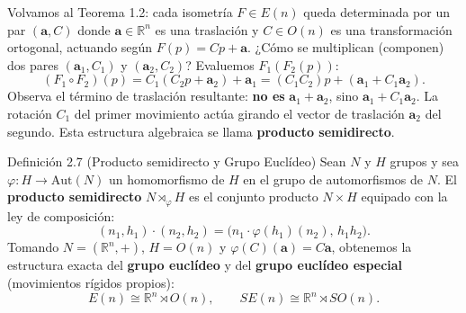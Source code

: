 \documentclass[11pt,letterpaper]{article}
\newcommand{\term}[1]{\textbf{\color{orangeacc}#1}}
\begin{document}
Volvamos al Teorema 1.2: cada isometría $F\in E(n)$ queda determinada por un par $(\mathbf{a},C)$ donde $\mathbf{a}\in\mathbb{R}^n$ es una traslación y $C\in O(n)$ es una transformación ortogonal, actuando según $F(p)=Cp+\mathbf{a}$. ¿Cómo se multiplican (componen) dos pares $(\mathbf{a}_1,C_1)$ y $(\mathbf{a}_2,C_2)$? Evaluemos $F_1(F_2(p))$:
\begin{equation}
  (F_1\circ F_2)(p) = C_1(C_2 p + \mathbf{a}_2) + \mathbf{a}_1 = (C_1 C_2)p + (\mathbf{a}_1 + C_1\mathbf{a}_2).
\end{equation}
Observa el término de traslación resultante: \textbf{no es} $\mathbf{a}_1+\mathbf{a}_2$, sino $\mathbf{a}_1 + C_1\mathbf{a}_2$. La rotación $C_1$ del primer movimiento actúa girando el vector de traslación $\mathbf{a}_2$ del segundo. Esta estructura algebraica se llama \term{producto semidirecto}.

\begin{infobox}[orangeacc]{Definición 2.7 (Producto semidirecto y Grupo Euclídeo)}
Sean $N$ y $H$ grupos y sea $\varphi:H\to\mathrm{Aut}(N)$ un homomorfismo de $H$ en el grupo de automorfismos de $N$. El \term{producto semidirecto} $N\rtimes_\varphi H$ es el conjunto producto $N\times H$ equipado con la ley de composición:
\begin{equation}
  (n_1,h_1)\cdot(n_2,h_2) = \bigl(n_1\cdot\varphi(h_1)(n_2),\,h_1 h_2\bigr).
\end{equation}
Tomando $N=(\mathbb{R}^n,+)$, $H=O(n)$ y $\varphi(C)(\mathbf{a})=C\mathbf{a}$, obtenemos la estructura exacta del \term{grupo euclídeo} y del \term{grupo euclídeo especial} (movimientos rígidos propios):
\begin{equation}
  E(n) \cong \mathbb{R}^n \rtimes O(n), \qquad SE(n) \cong \mathbb{R}^n \rtimes SO(n).
\end{equation}
\end{infobox}
\end{document}
